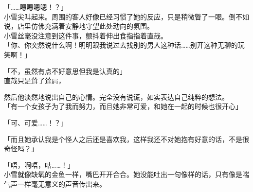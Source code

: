 「……嗯嗯嗯嗯！？」\\

小雪尖叫起来。周围的客人好像已经习惯了她的反应，只是稍微瞥了一眼。倒不如说，店里仿佛充满着安静地守望此处动向的氛围。\\

小雪丝毫没注意到这件事，颤抖着伸出食指指着直哉。\\

「你、你突然说什么啊！明明跟我说过去找别的男人这种话……别开这种无聊的玩笑啊！」

「不，虽然有点不好意思但我是认真的」\\

直哉只是耸了耸肩，

然后他淡然地说出自己的心情。完全没有说谎，如实表达自己纯粹的想法。\\

「有一个女孩子为了我而努力，而且她非常可爱，和她在一起的时候也很开心」

「可、可爱……！？」

「而且她承认我是个怪人之后还是喜欢我，这样我还不对她抱有好意的话，不是很奇怪吗？」

「唔，啊唔，咕……！」\\

小雪就像缺氧的金鱼一样，嘴巴开开合合。她没能吐出一句像样的话，只有像是喘气声一样毫无意义的声音传出来。\\

